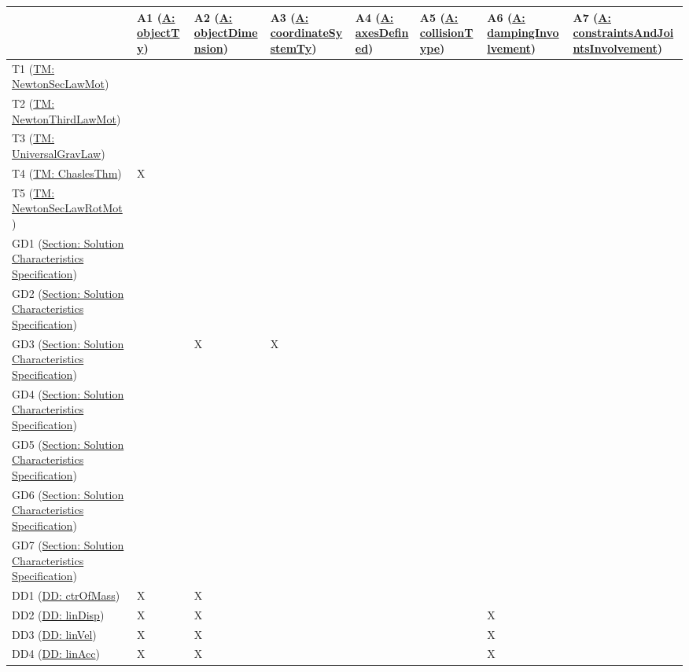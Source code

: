 \documentclass[12pt]{article}
\begin{document}
\begin{longtable}{l l l l l l l l}
\toprule
 & A1 (\hyperref[A:objectTy]{A: objectTy}) & A2 (\hyperref[A:objectDimension]{A: objectDimension}) & A3 (\hyperref[A:coordinateSystemTy]{A: coordinateSystemTy}) & A4 (\hyperref[A:axesDefined]{A: axesDefined}) & A5 (\hyperref[A:collisionType]{A: collisionType}) & A6 (\hyperref[A:dampingInvolvement]{A: dampingInvolvement}) & A7 (\hyperref[A:constraintsAndJointsInvolvement]{A: constraintsAndJointsInvolvement})
\\
\midrule
\endhead
T1 (\hyperref[TM:NewtonSecLawMot]{TM: NewtonSecLawMot}) &  &  &  &  &  &  & 
\\
T2 (\hyperref[TM:NewtonThirdLawMot]{TM: NewtonThirdLawMot}) &  &  &  &  &  &  & 
\\
T3 (\hyperref[TM:UniversalGravLaw]{TM: UniversalGravLaw}) &  &  &  &  &  &  & 
\\
T4 (\hyperref[TM:ChaslesThm]{TM: ChaslesThm}) & X &  &  &  &  &  & 
\\
T5 (\hyperref[TM:NewtonSecLawRotMot]{TM: NewtonSecLawRotMot}) &  &  &  &  &  &  & 
\\
GD1 (\hyperref[Sec:SolCharSpec]{Section: Solution Characteristics Specification}) &  &  &  &  &  &  & 
\\
GD2 (\hyperref[Sec:SolCharSpec]{Section: Solution Characteristics Specification}) &  &  &  &  &  &  & 
\\
GD3 (\hyperref[Sec:SolCharSpec]{Section: Solution Characteristics Specification}) &  & X & X &  &  &  & 
\\
GD4 (\hyperref[Sec:SolCharSpec]{Section: Solution Characteristics Specification}) &  &  &  &  &  &  & 
\\
GD5 (\hyperref[Sec:SolCharSpec]{Section: Solution Characteristics Specification}) &  &  &  &  &  &  & 
\\
GD6 (\hyperref[Sec:SolCharSpec]{Section: Solution Characteristics Specification}) &  &  &  &  &  &  & 
\\
GD7 (\hyperref[Sec:SolCharSpec]{Section: Solution Characteristics Specification}) &  &  &  &  &  &  & 
\\
DD1 (\hyperref[DD:ctrOfMass]{DD: ctrOfMass}) & X & X &  &  &  &  & 
\\
DD2 (\hyperref[DD:linDisp]{DD: linDisp}) & X & X &  &  &  & X & 
\\
DD3 (\hyperref[DD:linVel]{DD: linVel}) & X & X &  &  &  & X & 
\\
DD4 (\hyperref[DD:linAcc]{DD: linAcc}) & X & X &  &  &  & X & 
\\

\end{longtable}
\end{document}
